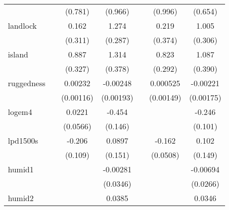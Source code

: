 {\begin{tabular}{l*{6}{c}}
            &                     &     (0.781)         &     (0.966)         &                     &     (0.996)         &     (0.654)         \\
[1em]
landlock    &                     &       0.162         &       1.274\sym{**} &                     &       0.219         &       1.005\sym{**} \\
            &                     &     (0.311)         &     (0.287)         &                     &     (0.374)         &     (0.306)         \\
[1em]
island      &                     &       0.887\sym{*}  &       1.314\sym{**} &                     &       0.823\sym{**} &       1.087\sym{**} \\
            &                     &     (0.327)         &     (0.378)         &                     &     (0.292)         &     (0.390)         \\
[1em]
ruggedness  &                     &     0.00232         &    -0.00248         &                     &    0.000525         &    -0.00221         \\
            &                     &   (0.00116)         &   (0.00193)         &                     &   (0.00149)         &   (0.00175)         \\
[1em]
logem4      &                     &      0.0221         &      -0.454\sym{**} &                     &                     &      -0.246\sym{*}  \\
            &                     &    (0.0566)         &     (0.146)         &                     &                     &     (0.101)         \\
[1em]
lpd1500s    &                     &      -0.206         &      0.0897         &                     &      -0.162\sym{**} &       0.102         \\
            &                     &     (0.109)         &     (0.151)         &                     &    (0.0508)         &     (0.149)         \\
[1em]
humid1      &                     &                     &    -0.00281         &                     &                     &    -0.00694         \\
            &                     &                     &    (0.0346)         &                     &                     &    (0.0266)         \\
[1em]
humid2      &                     &                     &      0.0385         &                     &                     &      0.0346         \\

\end{tabular}}
